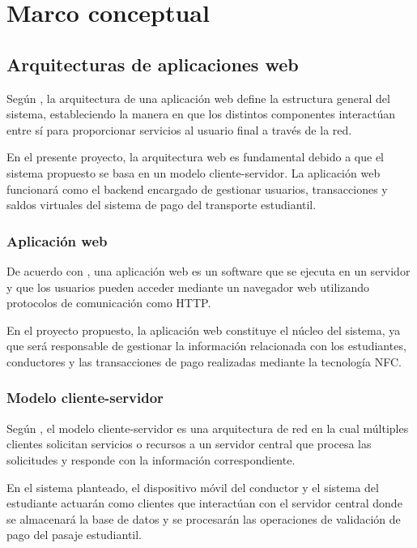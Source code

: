 \documentclass[12pt,letterpaper]{report}
\begin{document}
	\chapter{Marco conceptual}
	
	\section{Arquitecturas de aplicaciones web}
	
	Según \citet{pressman2014}, la arquitectura de una aplicación web define la estructura general del sistema, estableciendo la manera en que los distintos componentes interactúan entre sí para proporcionar servicios al usuario final a través de la red.
	
	En el presente proyecto, la arquitectura web es fundamental debido a que el sistema propuesto se basa en un modelo cliente-servidor. La aplicación web funcionará como el backend encargado de gestionar usuarios, transacciones y saldos virtuales del sistema de pago del transporte estudiantil.
	
	\subsection{Aplicación web}
	
	De acuerdo con \citet{kurose2017}, una aplicación web es un software que se ejecuta en un servidor y que los usuarios pueden acceder mediante un navegador web utilizando protocolos de comunicación como HTTP.
	
	En el proyecto propuesto, la aplicación web constituye el núcleo del sistema, ya que será responsable de gestionar la información relacionada con los estudiantes, conductores y las transacciones de pago realizadas mediante la tecnología NFC.
	
	\subsection{Modelo cliente-servidor}
	
	Según \citet{tanenbaum2016}, el modelo cliente-servidor es una arquitectura de red en la cual múltiples clientes solicitan servicios o recursos a un servidor central que procesa las solicitudes y responde con la información correspondiente.
	
	En el sistema planteado, el dispositivo móvil del conductor y el sistema del estudiante actuarán como clientes que interactúan con el servidor central donde se almacenará la base de datos y se procesarán las operaciones de validación de pago del pasaje estudiantil.
	
\end{document}
